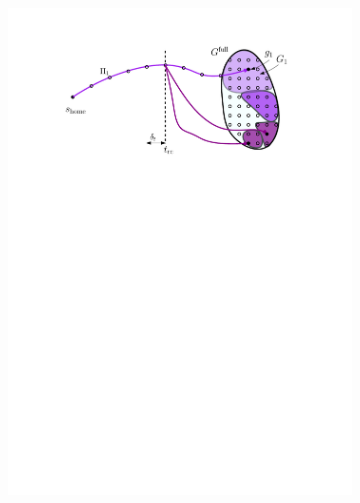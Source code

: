 \documentclass[conference]{IEEEtran}
\begin{document}
\begin{figure}[t]
\begin{subfigure}{0.225\textwidth}
        \includegraphics[width=\textwidth]{3_preprocess_loop_3}
        \caption{}
        \label{fig:pl3}
    \end{subfigure}
    \hspace{1mm}
    \begin{subfigure}{.225\textwidth}

\end{subfigure}
\end{figure}
\end{document}
